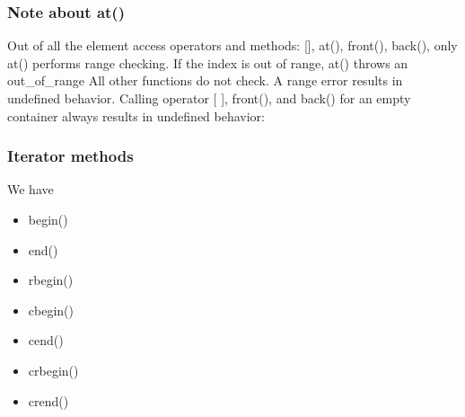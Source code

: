 \documentclass{report}
\begin{document}
\subsubsection{Note about at()}
\bigbreak \noindent 
Out of all the element access operators and methods: [], at(), front(), back(), only at() performs range checking. If the index is out of range, at() throws an out\_of\_range
\bigbreak \noindent 
All other functions do not check. A range error results in
undefined behavior. Calling operator [ ], front(), and back() for an empty container always
results in undefined behavior:

\bigbreak \noindent 
\subsubsection{Iterator methods}
\bigbreak \noindent 
We have
\begin{itemize}
    \item begin()
    \item end()
    \item rbegin()
    \item cbegin()
    \item cend()
    \item crbegin()
    \item crend()
\end{itemize}

    \bigbreak \noindent 
\end{document}
